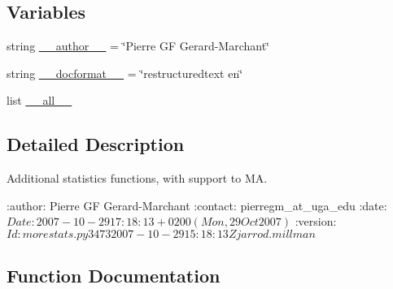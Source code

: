 \subsection*{Variables}
\begin{DoxyCompactItemize}
\item 
string \hyperlink{namespacescipy_1_1stats_1_1mstats__extras_a12ff97d453c95f3722912cc52d0645cf}{\+\_\+\+\_\+author\+\_\+\+\_\+} = \char`\"{}Pierre G\+F Gerard-\/Marchant\char`\"{}
\item 
string \hyperlink{namespacescipy_1_1stats_1_1mstats__extras_a02f09f8e218106feab0118a5edef61cb}{\+\_\+\+\_\+docformat\+\_\+\+\_\+} = \char`\"{}restructuredtext en\char`\"{}
\item 
list \hyperlink{namespacescipy_1_1stats_1_1mstats__extras_a187214ff603c513e6dbdae69d068d12d}{\+\_\+\+\_\+all\+\_\+\+\_\+}
\end{DoxyCompactItemize}


\subsection{Detailed Description}
\begin{DoxyVerb}Additional statistics functions, with support to MA.

:author: Pierre GF Gerard-Marchant
:contact: pierregm_at_uga_edu
:date: $Date: 2007-10-29 17:18:13 +0200 (Mon, 29 Oct 2007) $
:version: $Id: morestats.py 3473 2007-10-29 15:18:13Z jarrod.millman $
\end{DoxyVerb}
 

\subsection{Function Documentation}
\hypertarget{namespacescipy_1_1stats_1_1mstats__extras_aae2592d6f4e6886d9c9116663678cfce}{}
